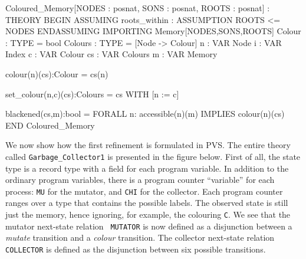 \begin{smallsession}
Coloured_Memory[NODES : posnat, SONS : posnat, ROOTS : posnat] : THEORY
BEGIN
  ASSUMING roots_within : ASSUMPTION ROOTS <= NODES ENDASSUMING
  IMPORTING Memory[NODES,SONS,ROOTS]
  Colour  : TYPE = bool
  Colours : TYPE = [Node -> Colour]
  n  : VAR Node 
  i  : VAR Index
  c  : VAR Colour
  cs : VAR Colours
  m  : VAR Memory

  colour(n)(cs):Colour = cs(n)

  set_colour(n,c)(cs):Colours = cs WITH [n := c]

  blackened(cs,m):bool = FORALL n: accessible(n)(m) IMPLIES colour(n)(cs)
END Coloured_Memory
\end{smallsession}
\label{pvs-coloured-memory}

We now show how the first refinement is formulated in PVS.  The entire
theory called  {\tt  Garbage\_Collector1} is presented in  the figure
below. First of all, the state type is a record type  with a field for
each program variable.  In addition to the ordinary program variables,
there is a program counter ``variable'' for each process: {\tt MU} for
the  mutator, and {\tt CHI}  for the collector.   Each program counter
ranges over a type  that contains the  possible labels.  The  observed
state  is   still just  the  memory,  hence ignoring, for   example, the
colouring  {\tt C}\@.  We see that  the mutator next-state relation {\tt
  MUTATOR} is now   defined as a  disjunction  between a {\em  mutate}
transition and a {\em  colour} transition. The collector  next-state
relation {\tt COLLECTOR} is   defined as the disjunction  between  six
possible transitions.

